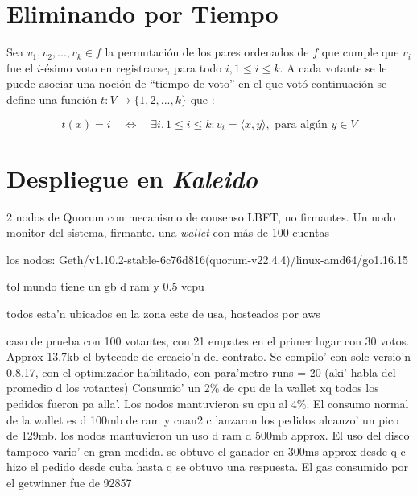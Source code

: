 


\section{Eliminando por Tiempo}

Sea $v_1, v_2, ..., v_k \in f$ la permutaci\'on de los pares ordenados de $f$ que cumple que $v_i$ fue el $i$-\'esimo voto en registrarse, para todo $i, 1 \leq i \leq k$. A cada votante se le puede asociar una noci\'on de ``tiempo de voto'' en el que vot\'o continuaci\'on se define una funci\'on $t: V \rightarrow \{1, 2, ..., k\}$ que :

$$
t(x) = i \quad \Leftrightarrow \quad \exists i, 1 \leq i \leq k: v_i = \langle x, y \rangle, \text{ para alg\'un } y \in V 
$$

\section{Despliegue en \textit{Kaleido}}
2 nodos de Quorum con mecanismo de consenso LBFT, no firmantes. Un nodo monitor del sistema, firmante. una \textit{wallet} con m\'as de 100 cuentas

los nodos: Geth/v1.10.2-stable-6c76d816(quorum-v22.4.4)/linux-amd64/go1.16.15

tol mundo tiene un gb d ram y 0.5 vcpu

todos esta'n ubicados en la zona este de usa, hosteados por aws

caso de prueba con 100 votantes, con 21 empates en el primer lugar con 30 votos. Approx 13.7kb el bytecode de creacio'n del contrato. Se compilo' con solc versio'n 0.8.17, con el optimizador habilitado, con para'metro runs = 20 (aki' habla  del promedio d los votantes)  Consumio' un 2\% de cpu de la wallet xq todos los pedidos fueron pa alla'. Los nodos mantuvieron su cpu al 4\%. El consumo normal de la wallet es d 100mb de ram y cuan2 c lanzaron los pedidos alcanzo' un pico de 129mb. los nodos mantuvieron un uso d ram d 500mb approx. El uso del disco tampoco vario' en gran medida. se obtuvo el ganador en 300ms approx desde q c hizo el pedido desde cuba hasta q se obtuvo una respuesta. El gas consumido por el getwinner fue de 92857